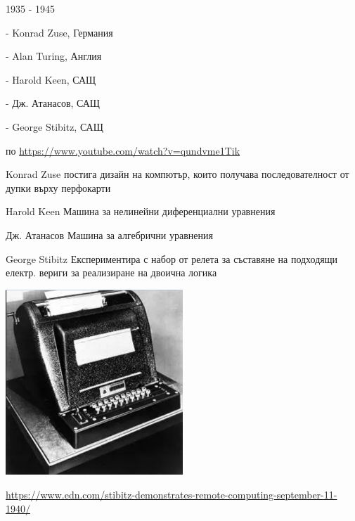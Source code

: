 \documentclass{beamer}
\begin{document}
\begin{frame}{1935 - 1945}

  - Konrad Zuse, Германия 

  - Alan Turing, Англия

  - Harold Keen, САЩ

  - Дж. Атанасов, САЩ

  - George Stibitz, САЩ

  \scriptsize по \url{https://www.youtube.com/watch?v=qundvme1Tik}
\end{frame}

\begin{frame}{Konrad Zuse}
  постига дизайн на компютър, които получава последователност от дупки върху перфокарти 
\end{frame}


\begin{frame}{Harold Keen}
  Машина за нелинейни диференциални уравнения
\end{frame}

\begin{frame}{Дж. Атанасов}
  Машина за алгебрични уравнения
\end{frame}


\begin{frame}[plain]{George Stibitz}
  Експериментира с набор от релета за съставяне на подходящи електр. вериги за реализиране на двоична логика

  \includegraphics[width=0.5\textwidth]{stibitz-machine}

  \url{https://www.edn.com/stibitz-demonstrates-remote-computing-september-11-1940/}
\end{frame}
\end{document}
